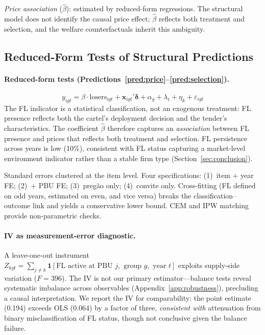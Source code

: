 \emph{Price association} ($\hat{\beta}$): estimated by reduced-form
regressions. The structural model does not identify the causal
price effect; $\hat{\beta}$ reflects both treatment and selection,
and the welfare counterfactuals inherit this ambiguity.


\subsection{Reduced-Form Tests of Structural Predictions}
\label{sec:reduced_form}

\paragraph{Reduced-form tests (Predictions~\ref{pred:price}--\ref{pred:selection}).}
\begin{equation}
  y_{igt} = \beta \cdot \text{losers}_{igt} + \mathbf{x}_{igt}'
  \boldsymbol{\delta} + \alpha_g + \lambda_t + \eta_k + \varepsilon_{igt}
  \label{eq:ols_main}
\end{equation}
The FL indicator is a statistical classification, not an exogenous
treatment: FL presence reflects both the cartel's deployment decision
and the tender's characteristics. The coefficient $\hat{\beta}$
therefore captures an \emph{association} between FL presence and
prices that reflects both treatment and selection. FL persistence
across years is low (10\%), consistent with FL status capturing a
market-level environment indicator rather than a stable firm type
(Section~\ref{sec:conclusion}).

Standard errors clustered at the item level. Four specifications:
(1)~item + year FE; (2)~+ PBU FE; (3)~preg\~ao only; (4)~convite
only. Cross-fitting (FL defined on odd years, estimated on even, and
vice versa) breaks the classification--outcome link and yields a
conservative lower bound. CEM and IPW matching provide non-parametric
checks.

\paragraph{IV as measurement-error diagnostic.}
A leave-one-out instrument
$Z_{kgt} = \sum_{j \neq k} \mathbf{1}[\text{FL active at PBU } j,
\text{ group } g, \text{ year } t]$
exploits supply-side variation ($F = 396$). The IV is not our
primary estimator---balance tests reveal systematic imbalance across
observables (Appendix~\ref{app:robustness}), precluding a causal
interpretation. We report the IV for comparability: the point
estimate (0.194) exceeds OLS (0.064) by a factor of three,
\emph{consistent with} attenuation from binary misclassification of
FL status, though not conclusive given the balance failure.


